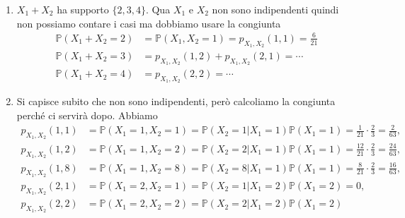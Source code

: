 \documentclass[a4paper]{article}
\begin{document}
\begin{snippetsolution}{}
\begin{enumerate}
\[            \]
            Da prima sappiamo che
            \begin{align*}
                p_{X_1}(1) &= \mathbb P(X_1 = 1) = \mathbb P(E_1^{(1)}) = \frac23 \\
                p_{X_2}(2) &= \mathbb P(X_2 = 2) = \mathbb P(E_2^{(2)}) = \frac{37}{63}
            \end{align*}
            Tuttavia,
            \[
                p_{X_1, X_2}(1,2) = \frac{24}{63}\neq\frac23 \cdot \frac{37}{63}=p_{X_1}(1)p_{X_2}(2)
            \]
            che differiscono.
        \item \(X_1 + X_2\) ha supporto \(\{2,3,4\}\). Qua \(X_1\) e \(X_2\)
            non sono indipendenti quindi non possiamo contare
            i casi ma dobbiamo usare la congiunta
            \begin{align*}
                \mathbb P(X_1 + X_2 = 2) &= \mathbb P(X_1, X_2 = 1) = p_{X_1, X_2}(1,1) = \frac{6}{21} \\
                \mathbb P(X_1 + X_2 = 3) &= p_{X_1, X_2}(1,2) + p_{X_1, X_2}(2,1) = \cdots \\
                \mathbb P(X_1 + X_2 = 4) &= p_{X_1, X_2}(2,2) = \cdots
            \end{align*}
        \item Si capisce subito che non sono indipendenti, però calcoliamo la congiunta
            perché ci servirà dopo. Abbiamo
            \begin{align*}
                p_{X_1,X_2}(1,1)
                &= \mathbb P(X_1 = 1, X_2 = 1)
                = \mathbb P(X_2 = 1 | X_1 = 1)\mathbb P(X_1 = 1)
                = \frac{1}{21}\cdot \frac23 = \frac{2}{63}, \\
                p_{X_1,X_2}(1,2)
                &= \mathbb P(X_1 = 1, X_2 = 2)
                = \mathbb P(X_2 = 2 | X_1 = 1)\mathbb P(X_1 = 1)
                = \frac{12}{21}\cdot \frac23 = \frac{24}{63}, \\
                p_{X_1,X_2}(1,8)
                &= \mathbb P(X_1 = 1, X_2 = 8)
                = \mathbb P(X_2 = 8 | X_1 = 1)\mathbb P(X_1 = 1)
                = \frac{8}{21}\cdot \frac23 = \frac{16}{63}, \\
                p_{X_1,X_2}(2,1)
                &= \mathbb P(X_1 = 2, X_2 = 1)
                = \mathbb P(X_2 = 1 | X_1 = 2)\mathbb P(X_1 = 2)
                = 0, \\
                p_{X_1,X_2}(2,2)
                &= \mathbb P(X_1 = 2, X_2 = 2)
                = \mathbb P(X_2 = 2 | X_1 = 2)\mathbb P(X_1 = 2)

\end{align*}
\end{enumerate}
\end{snippetsolution}
\end{document}
